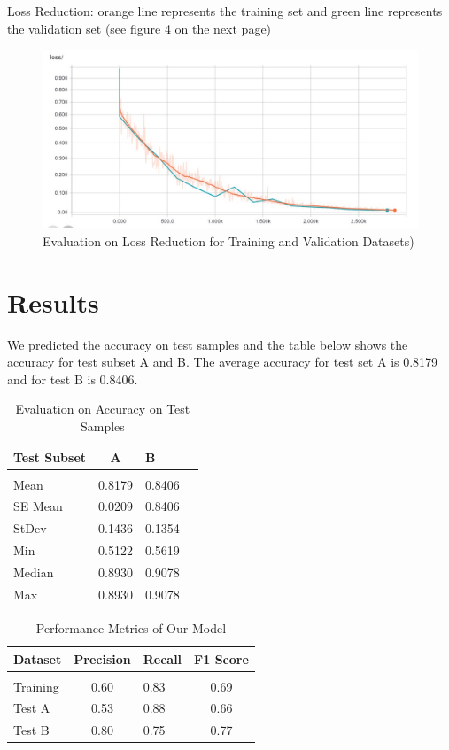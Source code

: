 \documentclass[twoside,11pt]{article}
\begin{document}
Loss Reduction: orange line represents the training set and green line represents the validation set
(see figure 4 on the next page)

\begin{figure}[htbp]
\centering
\includegraphics[width=.8\textwidth]{figure6.jpg}
\caption{Evaluation on Loss Reduction for Training and Validation Datasets)}
\label{figure1}
\end{figure}


\newpage
\section{Results} \label{results}
We predicted the accuracy on test samples and the table below shows the accuracy for test subset A and B. The average accuracy for test set A is 0.8179 and for test B is 0.8406.

\begin{table}[htbp]
  \centering 
  \begin{tabular}{lclc} 
    Test Subset & A& B \\ 
    \hline \\[-11pt]
    Mean & 0.8179&0.8406\\
    SE Mean & 0.0209 &0.8406\\
    StDev & 0.1436 & 0.1354\\
    Min & 0.5122 & 0.5619\\
    Median & 0.8930 &0.9078\\
    Max & 0.8930 &0.9078\\\hline
  \end{tabular}
  \label{tab:example} 
    \caption{Evaluation on Accuracy on Test Samples} 
\end{table}

\begin{table}[htbp]
  \centering 
  \begin{tabular}{lclc} 
    Dataset & Precision & Recall & F1 Score\\ 
    \hline \\[-11pt]
    Training & 0.60 & 0.83 &0.69 \\ 
    Test A    & 0.53 & 0.88 & 0.66\\
    Test B    & 0.80 & 0.75 & 0.77 \\ \hline
  \end{tabular}
  \label{tab:example} 
    \caption{Performance Metrics of Our Model} 
\end{table}
\end{document}
